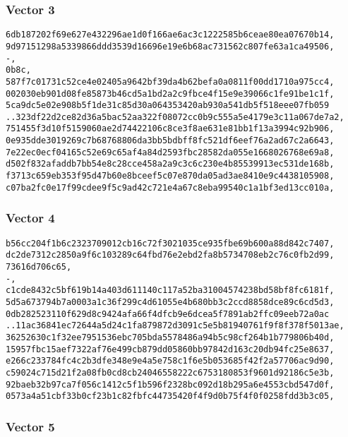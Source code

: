 \documentclass[
]{article}
\begin{document}
\hypertarget{vector-3-1}{%
\subsubsection{Vector 3}\label{vector-3-1}}

\begin{verbatim}
6db187202f69e627e432296ae1d0f166ae6ac3c1222585b6ceae80ea07670b14,
9d97151298a5339866ddd3539d16696e19e6b68ac731562c807fe63a1ca49506,
-,
0b8c,
587f7c01731c52ce4e02405a9642bf39da4b62befa0a0811f00dd1710a975cc4,
002030eb901d08fe85873b46cd5a1bd2a2c9fbce4f15e9e39066c1fe91be1c1f,
5ca9dc5e02e908b5f1de31c85d30a064353420ab930a541db5f518eee07fb059
..323df22d2ce82d36a5bac52aa322f08072cc0b9c555a5e4179e3c11a067de7a2,
751455f3d10f5159060ae2d74422106c8ce3f8ae631e81bb1f13a3994c92b906,
0e935dde3019269c7b68768806da3bb5bdbff8fc521df6eef76a2ad67c2a6643,
7e22ec0ecf04165c52e69c65af4a84d2593fbc28582da055e1668026768e69a8,
d502f832afaddb7bb54e8c28cce458a2a9c3c6c230e4b85539913ec531de168b,
f3713c659eb353f95d47b60e8bceef5c07e870da05ad3ae8410e9c4438105908,
c07ba2fc0e17f99cdee9f5c9ad42c721e4a67c8eba99540c1a1bf3ed13cc010a,
\end{verbatim}

\hypertarget{vector-4-1}{%
\subsubsection{Vector 4}\label{vector-4-1}}

\begin{verbatim}
b56cc204f1b6c2323709012cb16c72f3021035ce935fbe69b600a88d842c7407,
dc2de7312c2850a9f6c103289c64fbd76e2ebd2fa8b5734708eb2c76c0fb2d99,
73616d706c65,
-,
c1cde8432c5bf619b14a403d611140c117a52ba31004574238bd58bf8fc6181f,
5d5a673794b7a0003a1c36f299c4d61055e4b680bb3c2ccd8858dce89c6cd5d3,
0db282523110f629d8c9424afa66f4dfcb9e6dcea5f7891ab2ffc09eeb72a0ac
..11ac36841ec72644a5d24c1fa879872d3091c5e5b81940761f9f8f378f5013ae,
36252630c1f32ee7951536ebc705bda5578486a94b5c98cf264b1b779806b40d,
15957fbc15aef7322af76e499cb879dd05860bb97842d163c20db94fc25e8637,
e266c233784fc4c2b3dfe348e9e4a5e758c1f6e5b053685f42f2a57706ac9d90,
c59024c715d21f2a08fb0cd8cb24046558222c6753180853f9601d92186c5e3b,
92baeb32b97ca7f056c1412c5f1b596f2328bc092d18b295a6e4553cbd547d0f,
0573a4a51cbf33b0cf23b1c82fbfc44735420f4f9d0b75f4f0f0258fdd3b3c05,
\end{verbatim}

\hypertarget{vector-5-1}{%
\subsubsection{Vector 5}\label{vector-5-1}}
\end{document}
